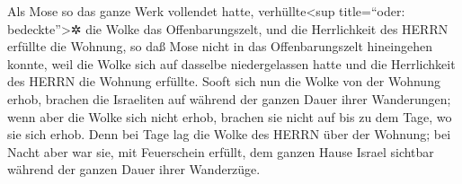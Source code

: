  Als Mose so das ganze Werk vollendet hatte,
verhüllte\textless sup title=``oder: bedeckte''\textgreater✲ die Wolke
das Offenbarungszelt, und die Herrlichkeit des HERRN erfüllte die
Wohnung,  so daß Mose nicht in das Offenbarungszelt
hineingehen konnte, weil die Wolke sich auf dasselbe niedergelassen
hatte und die Herrlichkeit des HERRN die Wohnung erfüllte.
 Sooft sich nun die Wolke von der Wohnung erhob, brachen
die Israeliten auf während der ganzen Dauer ihrer Wanderungen;
 wenn aber die Wolke sich nicht erhob, brachen sie nicht
auf bis zu dem Tage, wo sie sich erhob.  Denn bei Tage
lag die Wolke des HERRN über der Wohnung; bei Nacht aber war sie, mit
Feuerschein erfüllt, dem ganzen Hause Israel sichtbar während der ganzen
Dauer ihrer Wanderzüge.
